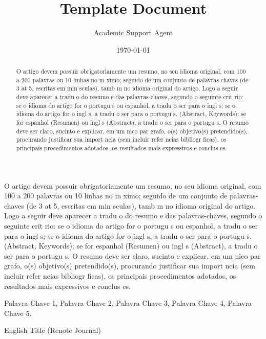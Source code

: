 \documentclass{article}
\title{Template Document}
\author{Academic Support Agent}
\date{\today}
\begin{document}
\maketitle

\maketitle

\begin{resumo} 
O artigo devem possuir obrigatoriamente um resumo, no seu idioma original, com 100 a 200 palavras ou 10 linhas no m ximo; seguido de um conjunto de palavras-chaves (de 3 at  5, escritas em min sculas), tamb m no idioma original do artigo. Logo a seguir deve aparecer a tradu o do resumo e das palavras-chaves, segundo o seguinte crit rio: se o idioma do artigo for o portugu s ou espanhol, a tradu o ser  para o ingl s; se o idioma do artigo for o ingl s, a tradu o ser  para o portugu s. (Abstract, Keywords); se for espanhol (Resumen) ou ingl s (Abstract), a tradu o ser  para o portugu s. O resumo deve ser claro, sucinto e explicar, em um  nico par grafo, o(s) objetivo(s) pretendido(s), procurando justificar sua import ncia (sem incluir refer ncias bibliogr ficas), os principais procedimentos adotados, os resultados mais expressivos e conclus es.
\end{resumo}

\begin{palavas-chave}
    Palavra Chave 1, Palavra Chave 2, Palavra Chave 3, Palavra Chave 4, Palavra Chave 5.
\end{palavas-chave}

\begin{englishtitle}
    English Title (Renote Journal)
\end{englishtitle}

\begin{abstract}
O artigo devem possuir obrigatoriamente um resumo, no seu idioma original, com 100 a 200 palavras ou 10 linhas no m ximo; seguido de um conjunto de palavras-chaves (de 3 at  5, escritas em min sculas), tamb m no idioma original do artigo. Logo a seguir deve aparecer a tradu o do resumo e das palavras-chaves, segundo o seguinte crit rio: se o idioma do artigo for o portugu s ou espanhol, a tradu o ser  para o ingl s; se o idioma do artigo for o ingl s, a tradu o ser  para o portugu s. (Abstract, Keywords); se for espanhol (Resumen) ou ingl s (Abstract), a tradu o ser  para o portugu s. O resumo deve ser claro, sucinto e explicar, em um  nico par grafo, o(s) objetivo(s) pretendido(s), procurando justificar sua import ncia (sem incluir refer ncias bibliogr ficas), os principais procedimentos adotados, os resultados mais expressivos e conclus es.
\end{abstract}
\end{document}
